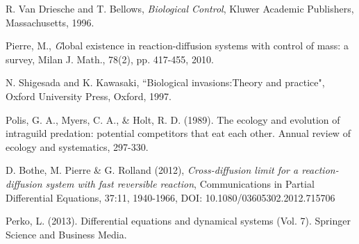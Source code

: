 \documentclass[10pt]{amsart}
\theoremstyle{definition}
\begin{document}
\begin{thebibliography}{}
  R. Van Driesche and  T. Bellows,
\newblock \emph{Biological Control},
\newblock  Kluwer Academic Publishers, Massachusetts, 1996.


%



 Pierre, M., {\emph Global existence in reaction-diffusion systems with control of mass: a survey}, Milan J. Math., 78(2), pp. 417-455, 2010.


 N. Shigesada and K. Kawasaki,
\newblock ``Biological invasions:Theory and practice",
\newblock Oxford University Press, Oxford, 1997.

%


Polis, G. A., Myers, C. A., \& Holt, R. D. (1989). The ecology and evolution of intraguild predation: potential competitors that eat each other. Annual review of ecology and systematics, 297-330.






 D. Bothe, M. Pierre \& G. Rolland (2012),
\newblock \emph{Cross-diffusion limit for a reaction-diffusion system with fast reversible reaction},
\newblock Communications in Partial Differential Equations, 37:11, 1940-1966, DOI: 10.1080/03605302.2012.715706

Perko, L. (2013). Differential equations and dynamical systems (Vol. 7). Springer Science and Business Media.


\end{thebibliography}
\end{document}

